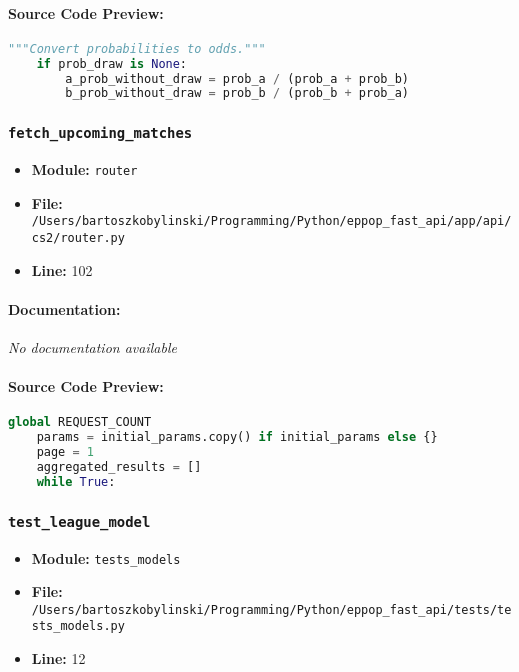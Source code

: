 \documentclass[11pt,a4paper]{article}
\begin{document}
\paragraph{Source Code Preview:}
\begin{lstlisting}[language=Python]
    """Convert probabilities to odds."""
    if prob_draw is None:
        a_prob_without_draw = prob_a / (prob_a + prob_b)
        b_prob_without_draw = prob_b / (prob_b + prob_a)

\end{lstlisting}

\vspace{1em}
\subsubsection{\texttt{fetch\_upcoming\_matches}}

\begin{itemize}
    \item \textbf{Module:} \texttt{router}
    \item \textbf{File:} \texttt{/Users/bartoszkobylinski/Programming/Python/eppop\_fast\_api/app/api/cs2/router.py}
    \item \textbf{Line:} 102
\end{itemize}

\paragraph{Documentation:} \textit{No documentation available}

\paragraph{Source Code Preview:}
\begin{lstlisting}[language=Python]
    global REQUEST_COUNT
    params = initial_params.copy() if initial_params else {}
    page = 1
    aggregated_results = []
    while True:
\end{lstlisting}

\vspace{1em}
\subsubsection{\texttt{test\_league\_model}}

\begin{itemize}
    \item \textbf{Module:} \texttt{tests\_models}
    \item \textbf{File:} \texttt{/Users/bartoszkobylinski/Programming/Python/eppop\_fast\_api/tests/tests\_models.py}
    \item \textbf{Line:} 12
\end{itemize}
\end{document}
